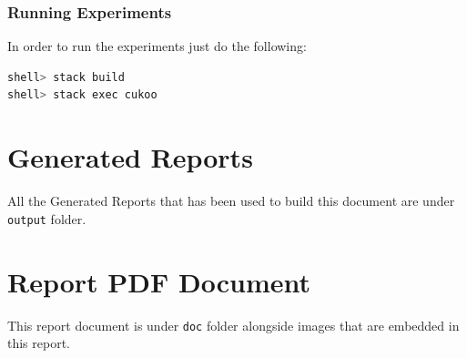 \documentclass[12pt, a4paper]{article}
\begin{document}
\subsubsection{Running Experiments}

In order to run the experiments just do the following:

\begin{lstlisting}[language=Haskell,title={Running Experiments}]
shell> stack build
shell> stack exec cukoo
\end{lstlisting}

\section{Generated Reports}
All the Generated Reports that has been used to build this document are under \texttt{output} folder.


\section{Report PDF Document}
This report document is under \texttt{doc} folder alongside images that are embedded in this report.





\printglossary[type=\acronymtype]
\end{document}
